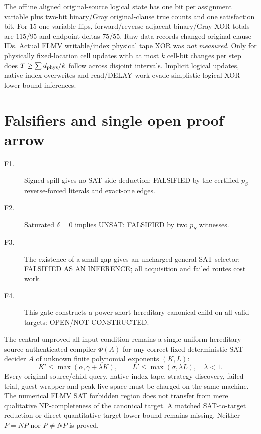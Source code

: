 \documentclass[11pt]{article}
\begin{document}
The offline aligned original-source logical state has one bit per assignment variable plus two-bit binary/Gray original-clause true counts and one satisfaction bit. For 15 one-variable flips, forward/reverse adjacent binary/Gray XOR totals are $115/95$ and endpoint deltas $75/55$. Raw data records changed original clause IDs. Actual FLMV writable/index physical tape XOR was \emph{not measured}. Only for physically fixed-location cell updates with at most $k$ cell-bit changes per step does $T\ge\sum d_{\rm phys}/k$ follow across disjoint intervals. Implicit logical updates, native index overwrites and read/DELAY work evade simplistic logical XOR lower-bound inferences.

\section{Falsifiers and single open proof arrow}
\begin{description}
\item[F1.] Signed spill gives no SAT-side deduction: FALSIFIED by the certified $p_S$ reverse-forced literals and exact-one edges.
\item[F2.] Saturated $\delta=0$ implies UNSAT: FALSIFIED by two $p_S$ witnesses.
\item[F3.] The existence of a small gap gives an uncharged general SAT selector: FALSIFIED AS AN INFERENCE; all acquisition and failed routes cost work.
\item[F4.] This gate constructs a power-short hereditary canonical child on all valid targets: OPEN/NOT CONSTRUCTED.
\end{description}
The central unproved all-input condition remains a single uniform hereditary source-authenticated compiler $\Phi(A)$ for any correct fixed deterministic SAT decider $A$ of unknown finite polynomial exponents $(K,L)$:
\[
K'\le\max(\alpha,\gamma+\lambda K),\qquad
L'\le\max(\sigma,\lambda L),\quad\lambda<1.
\]
Every original-source/child query, native index tape, strategy discovery, failed trial, guest wrapper and peak live space must be charged on the same machine. The numerical FLMV SAT forbidden region does not transfer from mere qualitative NP-completeness of the canonical target. A matched SAT-to-target reduction or direct quantitative target lower bound remains missing. Neither $P=NP$ nor $P\ne NP$ is proved.
\end{document}
